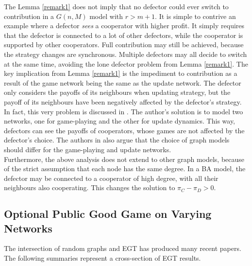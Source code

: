 The Lemma \ref{remark1} does not imply that no defector could ever switch to contribution in a $G(n,M)$ model with $r>m+1$. It is simple to contrive an example where a defector \emph{sees} a cooperator with higher profit. It simply requires that the defector is connected to a lot of other defectors, while the cooperator is supported by other cooperators. Full contribution may still be achieved, because the strategy changes are synchronous. Multiple defectors may all decide to switch at the same time, avoiding the lone defector problem from Lemma \ref{remark1}. The key implication from Lemma \ref{remark1} is the impediment to contribution as a result of the game network being the same as the update network. The defector only considers the payoffs of its neighbours when updating strategy, but the payoff of its neighbours have been negatively affected by the defector's strategy. In fact, this very problem is discussed in \cite{RN48}. The author's solution is to model two networks, one for game-playing and the other for update dynamics. This way, defectors can see the payoffs of cooperators, whose games are not affected by the defector's choice. The authors in \cite{RN48} also argue that the choice of graph models should differ for the game-playing and update networks.   \\

Furthermore, the above analysis does not extend to other graph models, because of the strict assumption that each node has the same degree. In a BA model, the defector may be connected to a cooperator of high degree, with all their neighbours also cooperating. This changes the solution to $\pi_C - \pi_D>0$. 

 \subsection{Optional Public Good Game on Varying Networks} 
 
  The intersection of random graphs and EGT has produced many recent papers. The following summaries represent a cross-section of EGT results.  \\
  
